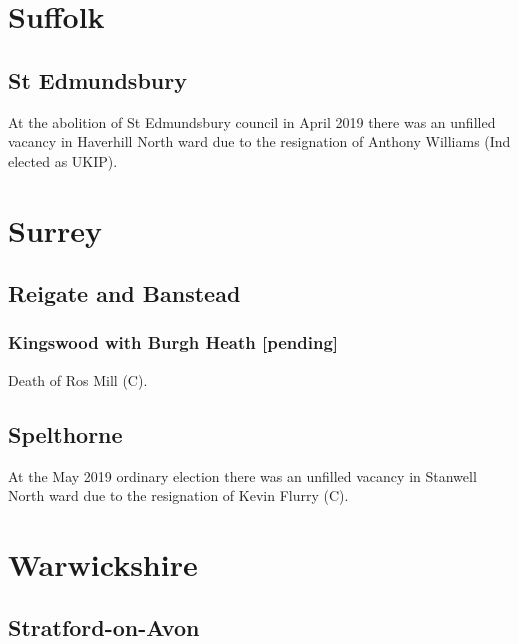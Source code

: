\documentclass[a4paper,openany]{book}
\begin{document}
\begin{resultsiii}
\section{Suffolk}

\subsection*{St Edmundsbury}

At the abolition of St Edmundsbury council in April 2019 there was an unfilled vacancy in Haverhill North ward due to the resignation of Anthony Williams (Ind elected as UKIP).

\section{Surrey}

\subsection*{Reigate and Banstead}

\subsubsection*{Kingswood with Burgh Heath \hspace*{\fill}\nolinebreak[1]%
	\enspace\hspace*{\fill}
	[pending]}


Death of Ros Mill (C).

\subsection*{Spelthorne}

At the May 2019 ordinary election there was an unfilled vacancy in Stanwell North ward due to the resignation of Kevin Flurry (C).

\section{Warwickshire}

\subsection*{Stratford-on-Avon}


\end{resultsiii}
\end{document}
